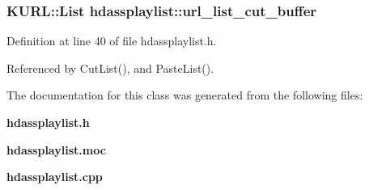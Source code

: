 \subsubsection{\setlength{\rightskip}{0pt plus 5cm}KURL::List {\bf hdassplaylist::url\_\-list\_\-cut\_\-buffer}}\label{classhdassplaylist_hdassplaylisto2}




Definition at line 40 of file hdassplaylist.h.

Referenced by Cut\-List(), and Paste\-List().

The documentation for this class was generated from the following files:\begin{CompactItemize}
\item 
{\bf hdassplaylist.h}\item 
{\bf hdassplaylist.moc}\item 
{\bf hdassplaylist.cpp}\end{CompactItemize}
